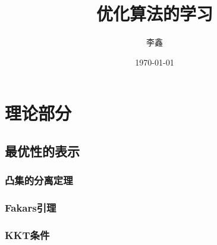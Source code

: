 \documentclass[UTF8]{ctexbook}
\begin{document}
\title{优化算法的学习}

\author{李鑫}

\date{\today}

\maketitle
\tableofcontents

\mainmatter %

\part{理论部分}

\chapter{最优性的表示}

\section{凸集的分离定理}

\section{Fakars引理}



\section{KKT条件}
\end{document}
